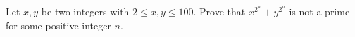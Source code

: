 Let $x,y$ be two integers with $2\leq x,y\leq100$. Prove that $x^{2^n}+y^{2^n}$ is not a prime for some positive integer $n$.